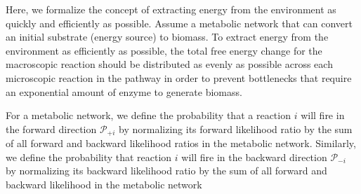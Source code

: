 Here, we formalize the concept of extracting energy from the environment as quickly and efficiently as possible. Assume a metabolic network that can convert an initial substrate (energy source) to biomass. To extract energy from the environment as efficiently as possible, the total free energy change for the macroscopic reaction should be distributed as evenly as possible across each microscopic reaction in the pathway in order to prevent bottlenecks that require an exponential amount of enzyme to generate biomass.


For a metabolic network, we define the probability that a reaction $i$ will fire in the forward  direction ${\mathcal P_{+i}}$ by normalizing its forward likelihood ratio by the sum of all forward and backward likelihood ratios in the metabolic network. Similarly, we define the probability that reaction $i$ will fire in the backward direction $\mathcal P_{-i}$ by normalizing its backward likelihood ratio by  the sum of all forward and backward likelihood in the metabolic network